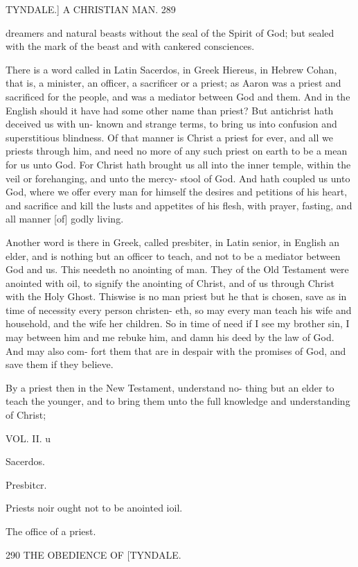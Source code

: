 \documentclass{custom}
\begin{document}
{{TYNDALE.]
A CHRISTIAN MAN.
289

dreamers and natural beasts without the seal of the Spirit 
of God; but sealed with the mark of the beast and with 
cankered consciences. 

There is a word called in Latin Sacerdos, in Greek 
Hiereus, in Hebrew Cohan, that is, a minister, an officer, 
a sacrificer or a priest; as Aaron was a priest and sacrificed 
for the people, and was a mediator between God and them. 
And in the English should it have had some other name 
than priest? But antichrist hath deceived us with un- 
known and strange terms, to bring us into confusion and 
superstitious blindness. Of that manner is Christ a 
priest for ever, and all we priests through him, and need no 
more of any such priest on earth to be a mean for us 
unto God. For Christ hath brought us all into the inner 
temple, within the veil or forehanging, and unto the mercy- 
stool of God. And hath coupled us unto God, where 
we offer every man for himself the desires and petitions of 
his heart, and sacrifice and kill the lusts and appetites of 
his flesh, with prayer, fasting, and all manner [of] godly 
living. 

Another word is there in Greek, called presbiter, in 
Latin senior, in English an elder, and is nothing but an 
officer to teach, and not to be a mediator between God 
and us. This needeth no anointing of man. They of 
the Old Testament were anointed with oil, to signify the 
anointing of Christ, and of us through Christ with the 
Holy Ghost. Thiswise is no man priest but he that is 
chosen, save as in time of necessity every person christen- 
eth, so may every man teach his wife and household, and 
the wife her children. So in time of need if I see my 
brother sin, I may between him and me rebuke him, and 
damn his deed by the law of God. And may also com- 
fort them that are in despair with the promises of God, 
and save them if they believe. 

By a priest then in the New Testament, understand no- 
thing but an elder to teach the younger, and to bring 
them unto the full knowledge and understanding of Christ; 

VOL. II. u 

Sacerdos. 

Presbitcr. 

Priests noir 
ought not 
to be 
anointed 
i\itli oil. 

The office 
of a priest. 


290
THE OBEDIENCE OF
[TYNDALE.

}}
\end{document}
